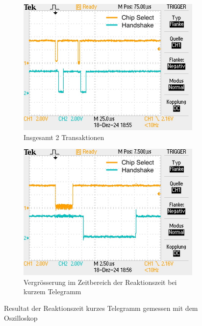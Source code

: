 \begin{figure}[H]
    \centering
    \begin{subfigure}[b]{0.45\textwidth}
        \centering
        \includegraphics[width=\linewidth]{Figures/Chap4/ESP32/Gesammte Transaktion Kurz.JPG} 
        \caption{Insgesamt 2 Transaktionen}
        \label{fig:GesTransKurz}
    \end{subfigure}
    \hfill 
    \begin{subfigure}[b]{0.45\textwidth}
        \centering
        \includegraphics[width=\linewidth]{Figures/Chap4/ESP32/Reaktionszeit Kurz.JPG} 
        \caption{Vergrösserung im Zeitbereich der Reaktionszeit bei kurzem Telegramm}
        \label{fig:ReakKurz}
    \end{subfigure}
    \caption{Resultat der Reaktionszeit kurzes Telegramm gemessen mit dem Oszilloskop}
    \label{fig:ResultatOsziReaktionKurz} 
\end{figure}

